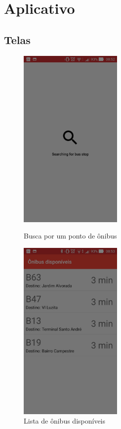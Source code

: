 \documentclass[
	12pt,				%
	oneside,			%
	a4paper,			%
	brazil				%
]{abntex2}
\begin{document}
{\newpage

\section{Aplicativo}

\subsection{Telas}

\begin{figure}[H]
\centering
\begin{minipage}{.5\textwidth}
  \centering
  \includegraphics[width=5cm]{images/beacon_searching_bus_stop}
  \caption{Busca por um ponto de ônibus}%
  \label{Rotulo}
\end{minipage}%
\begin{minipage}{.5\textwidth}
  \centering
  \includegraphics[width=5cm]{images/beacon_list_bus}
  \caption{Lista de ônibus disponíveis}%
  \label{Rotulo}
\end{minipage}
\end{figure}

}
\end{document}
